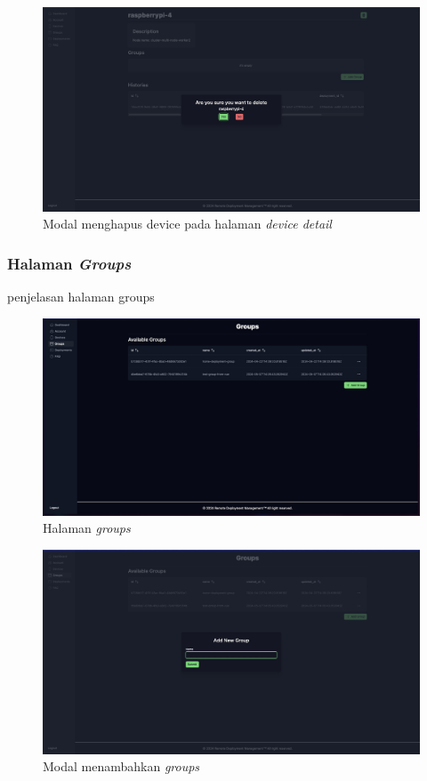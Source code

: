 \begin{figure}[h]
  \centering
  \includegraphics[width=1\textwidth]{resources/chapter-4/dashboard/device-detail-delete.jpg}
  \caption{Modal menghapus device pada halaman \textit{device detail}}
  \label{fig:halaman-device-detail-delete}
\end{figure}

\pagebreak

\subsubsection{Halaman \textit{Groups}}
penjelasan halaman groups
\begin{figure}[h]
  \centering
  \includegraphics[width=1\textwidth]{resources/chapter-4/dashboard/groups-page.jpg}
  \caption{Halaman \textit{groups}}
  \label{fig:halaman-groups}
\end{figure}

\begin{figure}[h]
  \centering
  \includegraphics[width=1\textwidth]{resources/chapter-4/dashboard/groups-page-add.jpg}
  \caption{Modal menambahkan \textit{groups}}
  \label{fig:halaman-groups-add}
\end{figure}

